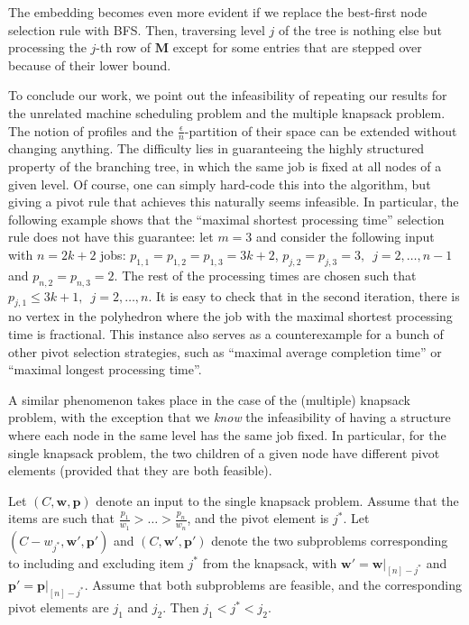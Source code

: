 \documentclass[a4paper,UKenglish,cleveref, autoref, thm-restate, pdfa]{lipics-v2021}
\theoremstyle{plain}
\begin{document}
The embedding becomes even more evident if we replace the best-first node selection rule with BFS. Then, traversing level $j$ of the tree is nothing else but processing the $j$-th row of $\bm{M}$ except for some entries that are stepped over because of their lower bound.

To conclude our work, we point out the infeasibility of repeating our results for the unrelated machine scheduling problem and the multiple knapsack problem. The notion of profiles and the $\frac{\epsilon}{n}$-partition of their space can be extended without changing anything. The difficulty lies in guaranteeing the highly structured property of the branching tree, in which the same job is fixed at all nodes of a given level. Of course, one can simply hard-code this into the algorithm, but giving a pivot rule that achieves this naturally seems infeasible. In particular, the following example shows that the ``maximal shortest processing time'' selection rule does not have this guarantee: let $m = 3$ and consider the following input with $n=2k+2$ jobs: $p_{1,1} = p_{1,2}=p_{1,3} = 3k+2$, $p_{j,2} = p_{j,3} = 3, \,\,\, j= 2, \ldots, n-1$ and $p_{n,2} = p_{n,3} = 2$. The rest of the processing times are chosen such that $p_{j,1} \le 3k+1, \,\,\, j = 2, \ldots, n$. It is easy to check that in the second iteration, there is no vertex in the polyhedron where the job with the maximal shortest processing time is fractional. This instance also serves as a counterexample for a bunch of other pivot selection strategies, such as ``maximal average completion time'' or ``maximal longest processing time''.

A similar phenomenon takes place in the case of the (multiple) knapsack problem, with the exception that we \emph{know} the infeasibility of having a structure where each node in the same level has the same job fixed. In particular, for the single knapsack problem, the two children of a given node have different pivot elements (provided that they are both feasible).

\begin{lemma}
    Let $(C, \bm{w}, \bm{p})$ denote an input to the single knapsack problem. Assume that the items are such that $\frac{p_1}{w_1} > \ldots > \frac{p_n}{w_n}$, and the pivot element is $j^*$. Let $(C-w_{j^*}, \bm{w}', \bm{p}')$ and $(C, \bm{w}', \bm{p}')$ denote the two subproblems corresponding to including and excluding item $j^*$ from the knapsack, with $\bm{w}' = \bm{w}|_{[n]-j^*}$ and $\bm{p}' = \bm{p}|_{[n]-j^*}$. Assume that both subproblems are feasible, and the corresponding pivot elements are $j_1$ and $j_2$. Then $j_1 < j^* < j_2$.
\end{lemma}
\end{document}
